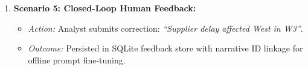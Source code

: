 \documentclass[11pt,a4paper]{article}
\begin{document}
\begin{enumerate}[leftmargin=*]
    \item \textbf{Scenario 5: Closed-Loop Human Feedback:}
    \begin{itemize}[noitemsep]
        \item \textit{Action:} Analyst submits correction: \textit{``Supplier delay affected West in W3''}.
        \item \textit{Outcome:} Persisted in SQLite feedback store with narrative ID linkage for offline prompt fine-tuning.
    \end{itemize}
\end{enumerate}
\end{document}
